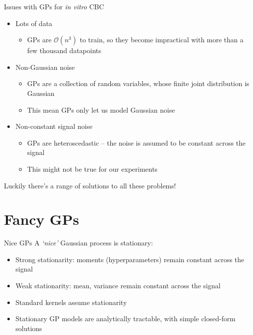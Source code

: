 \documentclass[presentation]{beamer}
\begin{document}
\begin{frame}[label={sec:orgb8e270c}]{Issues with GPs for \emph{in vitro} CBC}
\begin{itemize}
\item Lots of data
\begin{itemize}
\item GPs are \(\mathcal{O}(n^3)\) to train, so they become impractical with more than a few thousand datapoints
\end{itemize}
\item Non-Gaussian noise
\begin{itemize}
\item GPs are a collection of random variables, whose finite joint distribution is Gaussian
\item This mean GPs only let us model Gaussian noise
\end{itemize}
\item Non-constant signal noise
\begin{itemize}
\item GPs are heteroscedastic -- the noise is assumed to be constant across the signal
\item This might not be true for our experiments
\end{itemize}
\end{itemize}

\vfill

Luckily there's a range of solutions to all these problems!
\end{frame}


\section{Fancy GPs}
\label{sec:orgc823da4}
\begin{frame}[label={sec:org0fcf95c}]{Nice GPs}
A \emph{`nice'} Gaussian process is stationary:

\vfill

\begin{itemize}
\item Strong stationarity: moments (hyperparameters) remain constant across the signal
\item Weak stationarity: mean, variance remain constant across the signal
\item Standard kernels assume stationarity
\item Stationary GP models are analytically tractable, with simple closed-form solutions
\end{itemize}

\vfill
\end{frame}
\end{document}
